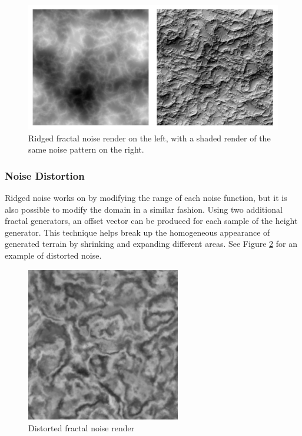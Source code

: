 \begin{figure}
	\centering
		\includegraphics[width=1.0\textwidth]{figures/ridgedfractal}
	\caption{Ridged fractal noise render on the left, with a shaded render of the same noise pattern on the right.}
	\label{fig:ridged}
\end{figure}

\subsubsection{Noise Distortion}

Ridged noise works on by modifying the range of each noise function, but it is also possible to modify the domain in a similar fashion.
Using two additional fractal generators, an offset vector can be produced for each sample of the height generator.
This technique helps break up the homogeneous appearance of generated terrain by shrinking and expanding different areas.
See Figure \ref{fig:distorted} for an example of distorted noise.

\begin{figure}
	\centering
		\includegraphics[width=0.6\textwidth]{figures/distorted}
	\caption{Distorted fractal noise render}
	\label{fig:distorted}
\end{figure}


